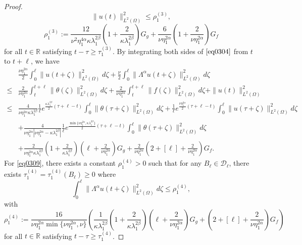 \documentclass[10pt,a4paper]{amsart}
\begin{document}
\begin{proof}
\begin{equation}\label{eq0315}
    \|u(t)\|_{L^2(\Omega)}^2 
    \leq 
    \rho_{1}^{(3)},
\end{equation}
\[
    \rho_{1}^{(3)} 
    := 
    \frac{12}{\nu^{2}\eta_1^{4\alpha}\kappa\lambda_{1}^{2\beta}}
    \left(1+\frac{2}{\kappa\lambda_{1}^{2\beta}}\right)
    G_g
    + 
    \frac{6}{\nu\eta_1^{2\alpha}} \left(1+\frac{2}{\nu\eta_1^{2\alpha}}\right)G_f
\]  
for all $t \in \mathbb{R}$ satisfying $t - \tau \geq \tau_{1}^{(3)}$. By integrating both sides of $\eqref{eq0304}$ from $t$ to $t+\ell$, we have
\begin{equation}\label{eq0309}
\begin{aligned}
  &\frac{\nu\eta_1^{2\alpha}}{2} \int_{0}^{\ell} \|u(t+\zeta)\|_{L^2(\Omega)}^2 d\zeta + \frac{\nu}{2} \int_{0}^{\ell} \| \Lambda^\alpha u(t+\zeta)\|_{L^2(\Omega)}^2 d\zeta \\
  \leq 
  &
  \frac{2}{\nu\eta_1^{2\alpha}} \int_{t}^{t+\ell} \|\theta(\zeta)\|_{L^2(\Omega)}^2 d\zeta 
  +\frac{2}{\nu\eta_1^{2\alpha}} \int_{t}^{t+\ell} \|f(\zeta)\|_{L^2(\Omega)}^2 d\zeta 
  + \|u(t)\|_{L^2(\Omega)}^2 \\
  \leq 
  & 
  \frac{4}{\nu\eta_1^{2\alpha}\kappa\lambda_1^{2\beta}} \frac{1}{\ell} e^{\frac{\kappa\lambda_{1}^{2\beta}}{2}(\tau+\ell-t)} \int_{0}^{\ell} \|\theta(\tau+\zeta)\|_{L^2(\Omega)}^2 d\zeta
  + \frac{1}{\ell} e^{\frac{\nu\eta_1^{2\alpha}}{2}(\tau+\ell-t)}  \int_{0}^{\ell} \|u(\tau+\zeta)\|_{L^2(\Omega)}^2 d\zeta \\
  &
   + \frac{4}{\nu\eta_1^{2\alpha}|\nu\eta_1^{2\alpha} - \kappa\lambda_1^{2\beta}|}  
   \frac{1}{\ell}
   e^{\frac{\min\{\nu\eta_1^{2\alpha},\kappa\lambda_1^{2\beta}\}}{2}(\tau+\ell-t)}
   \int_{0}^{\ell} 
   \|\theta(\tau+\zeta)\|_{L^2(\Omega)}^2  d\zeta \\
  &
  + \frac{2}{\nu\eta_1^{2\alpha}\kappa\lambda_{1}^{2\beta}} 
  \left(1+\frac{2}{\kappa\lambda_{1}^{2\beta}}\right)
  \left(\ell+\frac{2}{\nu\eta_1^{2\alpha}}\right)
  G_g
  + \frac{2}{\nu\eta_1^{2\alpha}} \left(2+[\ell]+\frac{2}{\nu\eta_1^{2\alpha}}\right)G_f.
\end{aligned}
\end{equation}
For \cref{eq0309}, there exists a constant $\rho_{1}^{(4)} > 0$ such that for any $B_{\ell} \in \mathcal{D}_{\ell}$, there exists $\tau_{1}^{(4)} = \tau_{1}^{(4)}(B_{\ell}) \geq 0$ where   
\begin{equation}\label{eq0314}
    \int_{0}^{\ell} \| \Lambda^\alpha u(t+\zeta)\|_{L^2(\Omega)}^2 d\zeta
    \leq 
    \rho_{1}^{(4)},
\end{equation} 
with
\[
    \rho_{1}^{(4)} 
    := 
    \frac{16}{\nu\eta_1^{2\alpha}\min\{\nu\eta_1^{2\alpha},\nu\}}
    \left(
    \frac{1}{\kappa\lambda_{1}^{2\beta}} 
    \left(1+\frac{2}{\kappa\lambda_{1}^{2\beta}}\right)
    \left(\ell+\frac{2}{\nu\eta_1^{2\alpha}}\right)
    G_g
    + 
    \left(2+[\ell]+\frac{2}{\nu\eta_1^{2\alpha}}\right)G_f\right)
\]
for all $t \in \mathbb{R}$ satisfying $t - \tau \geq \tau_{1}^{(4)}$.


\end{proof}
\end{document}
